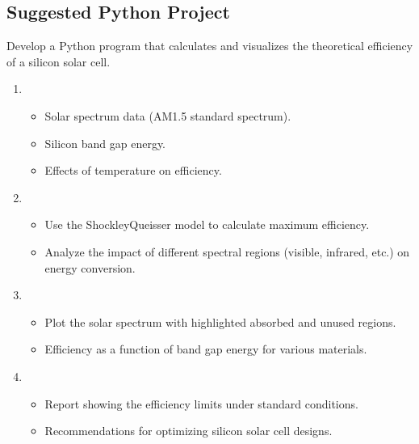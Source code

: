 \documentclass[letterpaper,10pt,english]{jupyterBook}
\begin{document}
\subsection{Suggested Python Project}
\label{\detokenize{ProjectInstructions:suggested-python-project}}
\sphinxAtStartPar
{} 
 Develop a Python program that calculates and visualizes
the theoretical efficiency of a silicon solar cell.
\begin{enumerate}
%
\item {} 
\sphinxAtStartPar
{}
\begin{itemize}
\item {} 
\sphinxAtStartPar
Solar spectrum data (AM1.5 standard spectrum).

\item {} 
\sphinxAtStartPar
Silicon band gap energy.

\item {} 
\sphinxAtStartPar
Effects of temperature on efficiency.

\end{itemize}

\item {} 
\sphinxAtStartPar
{}
\begin{itemize}
\item {} 
\sphinxAtStartPar
Use the Shockley\sphinxhyphen{}Queisser model to calculate maximum efficiency.

\item {} 
\sphinxAtStartPar
Analyze the impact of different spectral regions (visible,
infrared, etc.) on energy conversion.

\end{itemize}

\item {} 
\sphinxAtStartPar
{}
\begin{itemize}
\item {} 
\sphinxAtStartPar
Plot the solar spectrum with highlighted absorbed and unused
regions.

\item {} 
\sphinxAtStartPar
Efficiency as a function of band gap energy for various
materials.

\end{itemize}

\item {} 
\sphinxAtStartPar
{}
\begin{itemize}
\item {} 
\sphinxAtStartPar
Report showing the efficiency limits under standard conditions.

\item {} 
\sphinxAtStartPar
Recommendations for optimizing silicon solar cell designs.

\end{itemize}

\end{enumerate}
\end{document}
